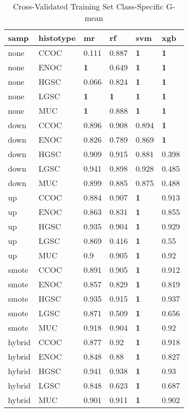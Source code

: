 \documentclass[
]{report}
\begin{document}
\begin{table}

\caption{\label{tab:train-gmean-class-table}Cross-Validated Training Set Class-Specific G-mean}
\centering
\begin{tabular}[t]{l|l|l|l|l|l}
\hline
samp & histotype & mr & rf & svm & xgb\\
\hline
none & CCOC & 0.111 & 0.887 & \textbf{1} & \textbf{1}\\
\hline
none & ENOC & \textbf{1} & 0.649 & \textbf{1} & \textbf{1}\\
\hline
none & HGSC & 0.066 & 0.824 & \textbf{1} & \textbf{1}\\
\hline
none & LGSC & \textbf{1} & \textbf{1} & \textbf{1} & \textbf{1}\\
\hline
none & MUC & \textbf{1} & 0.888 & \textbf{1} & \textbf{1}\\
\hline
down & CCOC & 0.896 & 0.908 & 0.894 & \textbf{1}\\
\hline
down & ENOC & 0.826 & 0.789 & 0.869 & \textbf{1}\\
\hline
down & HGSC & 0.909 & 0.915 & 0.881 & 0.398\\
\hline
down & LGSC & 0.941 & 0.898 & 0.928 & 0.485\\
\hline
down & MUC & 0.899 & 0.885 & 0.875 & 0.488\\
\hline
up & CCOC & 0.884 & 0.907 & \textbf{1} & 0.913\\
\hline
up & ENOC & 0.863 & 0.831 & \textbf{1} & 0.855\\
\hline
up & HGSC & 0.935 & 0.904 & \textbf{1} & 0.929\\
\hline
up & LGSC & 0.869 & 0.416 & \textbf{1} & 0.55\\
\hline
up & MUC & 0.9 & 0.905 & \textbf{1} & 0.92\\
\hline
smote & CCOC & 0.891 & 0.905 & \textbf{1} & 0.912\\
\hline
smote & ENOC & 0.857 & 0.829 & \textbf{1} & 0.819\\
\hline
smote & HGSC & 0.935 & 0.915 & \textbf{1} & 0.937\\
\hline
smote & LGSC & 0.871 & 0.509 & \textbf{1} & 0.656\\
\hline
smote & MUC & 0.918 & 0.904 & \textbf{1} & 0.92\\
\hline
hybrid & CCOC & 0.877 & 0.92 & \textbf{1} & 0.918\\
\hline
hybrid & ENOC & 0.848 & 0.88 & \textbf{1} & 0.827\\
\hline
hybrid & HGSC & 0.941 & 0.938 & \textbf{1} & 0.93\\
\hline
hybrid & LGSC & 0.848 & 0.623 & \textbf{1} & 0.687\\
\hline
hybrid & MUC & 0.901 & 0.911 & \textbf{1} & 0.902\\
\hline
\end{tabular}
\end{table}
\end{document}
